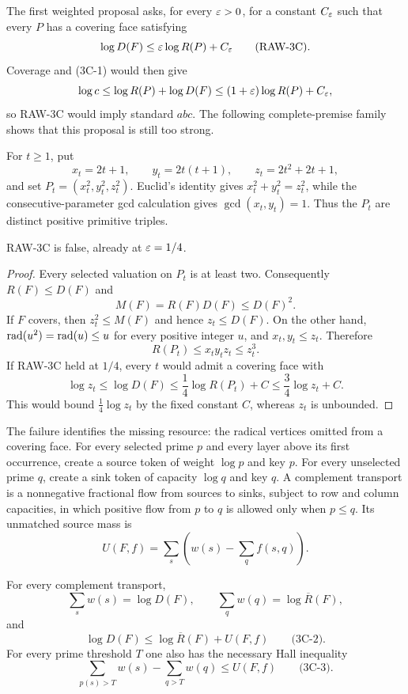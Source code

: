 The first weighted proposal asks, for every $\varepsilon>0$, for a constant
$C_\varepsilon$ such that every $P$ has a covering face satisfying
\[
 \log D(F)\le \varepsilon\log R(P)+C_\varepsilon
 \qquad\text{(RAW-3C)}.
\]
Coverage and (3C-1) would then give
\[
 \log c\le\log R(P)+\log D(F)
 \le(1+\varepsilon)\log R(P)+C_\varepsilon,
\]
so RAW-3C would imply standard $abc$.  The following complete-premise
family shows that this proposal is still too strong.

For $t\ge1$, put
\[
 x_t=2t+1,\qquad y_t=2t(t+1),\qquad
 z_t=2t^2+2t+1,
\]
and set $P_t=(x_t^2,y_t^2,z_t^2)$.  Euclid's identity gives
$x_t^2+y_t^2=z_t^2$, while the consecutive-parameter gcd calculation gives
$\gcd(x_t,y_t)=1$.  Thus the $P_t$ are distinct positive primitive triples.

\begin{theorem}
\label{thm:raw-three-arm-obstruction}
RAW-3C is false, already at $\varepsilon=1/4$.
\end{theorem}

\begin{proof}
Every selected valuation on $P_t$ is at least two.  Consequently
$R(F)\le D(F)$ and
\[
 M(F)=R(F)D(F)\le D(F)^2.
\]
If $F$ covers, then $z_t^2\le M(F)$ and hence $z_t\le D(F)$.  On the other
hand, $\operatorname{rad}(u^2)=\operatorname{rad}(u)\le u$ for every positive integer $u$, and
$x_t,y_t\le z_t$.  Therefore
\[
 R(P_t)\le x_ty_tz_t\le z_t^3.
\]
If RAW-3C held at $1/4$, every $t$ would admit a covering face with
\[
 \log z_t\le\log D(F)
 \le\frac14\log R(P_t)+C
 \le\frac34\log z_t+C.
\]
This would bound $\frac14\log z_t$ by the fixed constant $C$, whereas
$z_t$ is unbounded.
\end{proof}

The failure identifies the missing resource: the radical vertices omitted
from a covering face.  For every selected prime $p$ and every layer above
its first occurrence, create a source token of weight $\log p$ and key $p$.
For every unselected prime $q$, create a sink token of capacity $\log q$ and
key $q$.  A complement transport is a nonnegative fractional flow from
sources to sinks, subject to row and column capacities, in which positive
flow from $p$ to $q$ is allowed only when $p\le q$.  Its unmatched source
mass is
\[
 U(F,f)=\sum_s\left(w(s)-\sum_q f(s,q)\right).
\]

\begin{proposition}
\label{prop:three-arm-transport-accounting}
For every complement transport,
\[
 \sum_s w(s)=\log D(F),\qquad
 \sum_q w(q)=\log\overline R(F),
\]
and
\[
 \log D(F)\le\log\overline R(F)+U(F,f)
 \qquad\text{(3C-2)}.
\]
For every prime threshold $T$ one also has the necessary Hall inequality
\[
 \sum_{p(s)>T}w(s)-\sum_{q>T}w(q)\le U(F,f)
 \qquad\text{(3C-3)}.
\]
\end{proposition}

